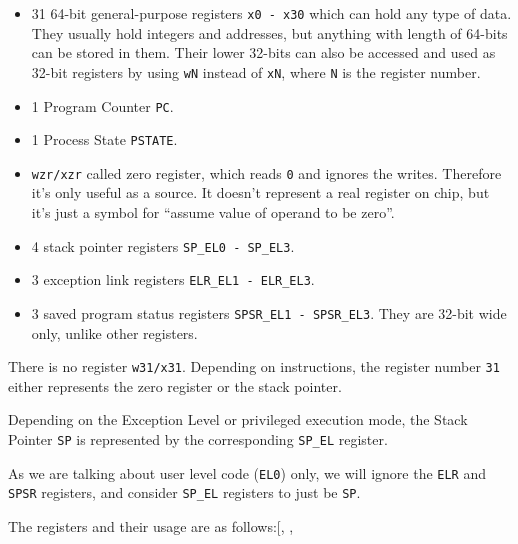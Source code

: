 \documentclass[a4paper, nobind]{templates/ociamthesis}
\providecommand{\tightlist}{%
  \setlength{\itemsep}{0pt}\setlength{\parskip}{0pt}}
\begin{document}
\begin{itemize}
\tightlist
\item
  31 64-bit general-purpose registers \texttt{x0\ -\ x30} which can hold any type of data.
  They usually hold integers and addresses, but anything with length of 64-bits
  can be stored in them. Their lower 32-bits can also be accessed and used as
  32-bit registers by using \texttt{wN} instead of \texttt{xN}, where \texttt{N} is the register number.
\item
  1 Program Counter \texttt{PC}.
\item
  1 Process State \texttt{PSTATE}.
\item
  \texttt{wzr/xzr} called zero register,
  which reads \texttt{0} and ignores the writes. Therefore it's only useful as a source.
  It doesn't represent a real register on chip,
  but it's just a symbol for ``assume value of operand to be zero''.
\item
  4 stack pointer registers \texttt{SP\_EL0\ -\ SP\_EL3}.
\item
  3 exception link registers \texttt{ELR\_EL1\ -\ ELR\_EL3}.
\item
  3 saved program status registers \texttt{SPSR\_EL1\ -\ SPSR\_EL3}. They are 32-bit wide only,
  unlike other registers.
\end{itemize}

There is no register \texttt{w31/x31}. Depending on instructions, the register number \texttt{31}
either represents the zero register or the stack pointer.

Depending on the Exception Level or privileged execution mode,
the Stack Pointer \texttt{SP} is represented by the corresponding \texttt{SP\_EL} register.

As we are talking about user level code (\texttt{EL0}) only, we will ignore the \texttt{ELR} and \texttt{SPSR}
registers, and consider \texttt{SP\_EL} registers to just be \texttt{SP}.

The registers and their usage are as follows:{[}, , \citeproc{ref-arm-pcs}{8}{]}
\end{document}
